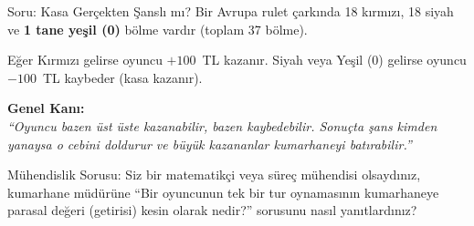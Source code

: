 ﻿\documentclass[light]{lutbeamer}
\begin{document}
\begin{frame}{Soru: Kasa Gerçekten Şanslı mı?}
    \justifying{}
    Bir Avrupa rulet çarkında 18 kırmızı, 18 siyah ve \textbf{1 tane yeşil (0)} bölme vardır (toplam 37 bölme).

    \vspace{1em}
    Eğer Kırmızı gelirse oyuncu $+100$~TL kazanır. Siyah veya Yeşil (0) gelirse oyuncu $-100$~TL kaybeder (kasa kazanır).
    
    \vspace{1em}
    \textbf{Genel Kanı:} \\
    \textit{``Oyuncu bazen üst üste kazanabilir, bazen kaybedebilir. Sonuçta şans kimden yanaysa o cebini doldurur ve büyük kazananlar kumarhaneyi batırabilir.''}

    \vspace{1.5em}
    \begin{exampleblock}{Mühendislik Sorusu:}
        Siz bir matematikçi veya süreç mühendisi olsaydınız, kumarhane müdürüne ``Bir oyuncunun tek bir tur oynamasının kumarhaneye parasal değeri (getirisi) kesin olarak nedir?'' sorusunu nasıl yanıtlardınız?
    \end{exampleblock}
\end{frame}
\end{document}
